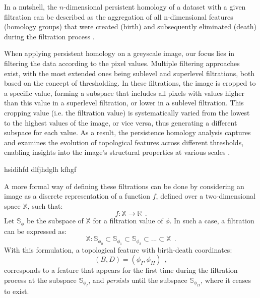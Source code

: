 \documentclass[12pt]{mythesis}
\begin{document}
In a nutshell, the $n$-dimensional persistent homology of a dataset with a given filtration can be described as the aggregation of all n-dimensional features (homology groups) that were created (birth) and subsequently eliminated (death) during the filtration process \citep{ph_filtration}.

When applying persistent homology on a greyscale image, our focus lies in filtering the data according to the pixel values. Multiple filtering approaches exist, with the most extended ones being sublevel and superlevel filtrations, both based on the concept of thresholding. In these filtrations, the image is cropped to a specific value, forming a subspace that includes all pixels with values higher than this value in a superlevel filtration, or lower in a sublevel filtration. This cropping value (i.e. the filtration value) is systematically varied from the lowest to the highest values of the image, or vice versa, thus generating a different subspace for each value. As a result, the persistence homology analysis captures and examines the evolution of topological features across different thresholds, enabling insights into the image's structural properties at various scales \citep{ph_image_filtration}.

hsidihfd
dlfjhdglh
kfhgf


A more formal way of defining these filtrations can be done by considering an image as a discrete representation of a function $f$, defined over a two-dimensional space $\mathbb{X}$, such that: 
\begin{equation}
    f :  \mathbb{X} \longrightarrow  \mathbb{R} \ \ .
\end{equation}
Let $\mathbb{S} _\phi$ be the subspace of $\mathbb{X}$ for a filtration value of $\phi$. In such a case, a filtration can be expressed as:
\begin{equation}
    \mathbb{X}: \mathbb{S}_{\phi_0} \subset \mathbb{S}_{\phi_1} \subset \mathbb{S}_{\phi_2}\subset... \subset \mathbb{X}\ \ .
\end{equation}
With this formulation, a topological feature with birth-death coordinates:
\begin{equation}
(B, D) = (\phi_ I, \phi _ {II}) \ \ ,
\end{equation} 
corresponds to a feature that appears for the first time during the filtration process at the subspace $\mathbb{S}_{\phi _ I}$, and \textit{persists} until the subspace $\mathbb{S}_{\phi _ {II}}$, where it ceases to exist.
\end{document}
